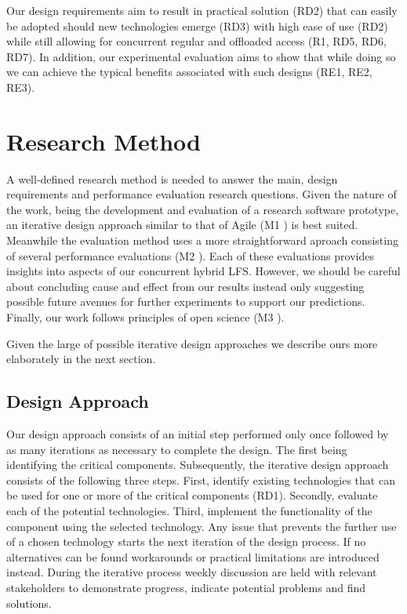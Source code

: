 Our design requirements aim to result in practical solution (RD2) that can
easily be adopted should new technologies emerge (RD3) with high ease of use
(RD2) while still allowing for concurrent regular and offloaded access
(R1, RD5, RD6, RD7). In addition, our experimental evaluation aims to show that
while doing so we can achieve the typical benefits associated with such designs
(RE1, RE2, RE3).

\section{Research Method}

A well-defined research method is needed to answer the main, design requirements
and performance evaluation research questions. Given the nature of the work,
being the development and evaluation of a research software prototype, an
iterative design approach similar to that of Agile
(M1 \cite{Schwaber2001AgileSD}) is best suited. Meanwhile the evaluation method
uses a more straightforward aproach consisting of several performance
evaluations (M2 \cite{Jain1991TheAO}). Each of these evaluations provides
insights into aspects of our concurrent hybrid LFS. However, we should
be careful about concluding cause and effect from our results instead only
suggesting possible future avenues for further experiments to support our
predictions. Finally, our work follows principles of open science
(M3 \cite{Wilkinson2016TheFG}).

Given the large of possible iterative design approaches we describe ours
more elaborately in the next section.

\subsection{Design Approach}

Our design approach consists of an initial step performed only once followed by
as many iterations as necessary to complete the design. The first being
identifying the critical components. Subsequently, the iterative design approach
consists of the following three steps. First, identify existing technologies
that can be used for one or more of the critical components (RD1). Secondly,
evaluate each of the potential technologies. Third, implement the
functionality of the component using the selected technology. Any issue that
prevents the further use of a chosen technology starts the next iteration of the
design process. If no alternatives can be found workarounds or practical
limitations are introduced instead. During the iterative process weekly
discussion are held with relevant stakeholders to demonstrate progress, indicate
potential problems and find solutions.

